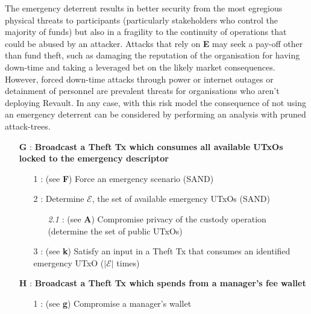 \documentclass[runningheads]{llncs}
\begin{document}
\noindent The emergency deterrent results in better security from the most egregious physical threats to participants (particularly stakeholders who control the majority of funds) but also in a fragility to the continuity of operations that could be abused by an attacker. Attacks that rely on \textbf{E} may seek a pay-off other than fund theft, such as damaging the reputation of the organisation for having down-time and taking a leveraged bet on the likely market consequences. However, forced down-time attacks through power or internet outages or detainment of personnel are prevalent threats for organisations who aren't deploying Revault. In any case, with this risk model the consequence of not using an emergency deterrent can be considered by performing an analysis with pruned attack-trees.


{\footnotesize
\begin{itemize}[noitemsep,parsep=0pt,partopsep=0pt, leftmargin=0.7cm]
\item[\textbf{G} :] \textbf{Broadcast a Theft Tx which consumes all available UTxOs locked to the emergency descriptor}
\begin{itemize}[noitemsep,topsep=0pt,parsep=0pt,partopsep=0pt, leftmargin=0.8cm]
\item[1 :] (see \textbf{F}) Force an emergency scenario (SAND)
\item[2 :] Determine $\mathcal{E}$, the set of available emergency UTxOs (SAND)
\begin{itemize}[noitemsep,topsep=0pt,parsep=0pt,partopsep=0pt, leftmargin=0.9cm]
\item[\textit{2.1} :] (see \textbf{A}) Compromise privacy of the custody operation (determine the set of public UTxOs)
\end{itemize}
\item[3 :] (see \textbf{k}) Satisfy an input in a Theft Tx that consumes an identified emergency UTxO ($|\mathcal{E}|$ times)
\end{itemize}
\end{itemize}
}

{\footnotesize
\begin{itemize}[noitemsep,parsep=0pt,partopsep=0pt, leftmargin=0.7cm]
\item[\textbf{H} :] \textbf{Broadcast a Theft Tx which spends from a manager’s fee wallet}
\begin{itemize}[noitemsep,topsep=0pt,parsep=0pt,partopsep=0pt, leftmargin=0.8cm]
\item[1 :] (see \textbf{g}) Compromise a manager’s wallet
\end{itemize}
\end{itemize}
}
\end{document}
